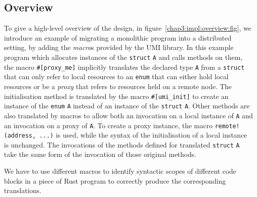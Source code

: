 \subsection{Overview}
\label{chap3:impl:overview}
To give a high-level overview of the design, in figure~\ref{chap3:impl:overview:fig}, we introduce an example of migrating a monolithic program into a distributed setting, by adding the \emph{macro}s provided by the UMI library. In this example program which allocates instances of the \lstinline{struct} \lstinline{A} and calls methods on them, the macro \lstinline{#[proxy_me]} implicitly translates the declared type \lstinline{A} from a \lstinline{struct} that can only refer to local resources to an \lstinline{enum} that can either hold local resources or be a \emph{proxy} that refers to resources held on a remote node. The initialisation method is translated by the macro \lstinline{#[umi_init]} to create an instance of the \lstinline{enum} \lstinline{A} instead of an instance of the \lstinline{struct} \lstinline{A}. Other methods are also translated by macros to allow both an invocation on a local instance of \lstinline{A} and an invocation on a proxy of \lstinline{A}. To create a proxy instance, the macro \lstinline{remote!(address, ...)} is used, while the syntax of the initialisation of a local instance is unchanged. The invocations of the methods defined for translated \lstinline{struct} \lstinline{A} take the same form of the invocation of those original methods. \begin{highlightnew}We have to use different macros to identify syntactic scopes of different code blocks in a piece of Rust program to correctly produce the corresponding translations.\end{highlightnew}

